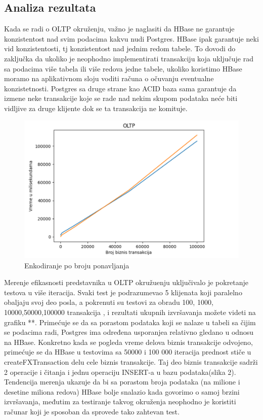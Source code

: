 \documentclass[12pt,oneside]{memoir}
\begin{document}
\subsection{Analiza rezultata}

Kada se radi o OLTP okruženju, važno je naglasiti da HBase ne garantuje konzistentost nad svim podacima kakvu nudi Postgres. HBase ipak garantuje neki vid konzistentosti, tj konzistentost nad jednim redom tabele. To dovodi do zaključka da ukoliko je neophodno implementirati transakciju koja uključuje rad sa podacima više tabela ili više redova jedne tabele, ukoliko koristimo HBase moramo na aplikativnom sloju voditi računa o očuvanju  eventualne konzistetnosti. Postgres sa druge strane kao ACID baza sama garantuje da izmene neke transakcije koje se rade nad nekim skupom podataka neće biti vidljive za druge klijente dok se ta transakcija ne komituje.

\begin{figure}[!ht]
  \centering
  \includegraphics[width=1\textwidth]{oltp-vizualization.png}
  \caption{Enkodiranje po broju ponavljanja}
  \label{fig:grafikon}
\end{figure}

Merenje efikasnosti predstavnika u OLTP okružuenju uključivalo je pokretanje testova u više iteracija. Svaki test je podrazumevao 5 klijenata koji paralelno obaljaju svoj deo posla, a pokrenuti su testovi za obradu 100, 1000, 10000,50000,100000 transakcija , i rezultati ukupnih izvršavanja možete videti na grafiku **. Primećuje se da sa porastom podataka koji se nalaze u tabeli sa čijim se podacima radi, Postgres ima određena usporanjea relativno gledano u odnosu na HBase. Konkretno kada se pogleda vreme delova biznis transakcije odvojeno, primećuje se da HBase u testovima sa 50000 i 100 000 iteracija prednost stiče u createFXTransaction delu cele biznis transakcije. Taj deo biznis transakcije sadrži 2 operacije i čitanja i jednu operaciju INSERT-a u bazu podataka(slika 2). Tendencija merenja ukazuje da bi sa porastom broja podataka (na milione i desetine miliona redova) HBase bolje snalazio kada govorimo o samoj brzini izvršavanja, međutim za testiranje takvog okruženja neophodno je koristiti računar koji je sposoban da sprovede tako zahtevan test.
\end{document}
